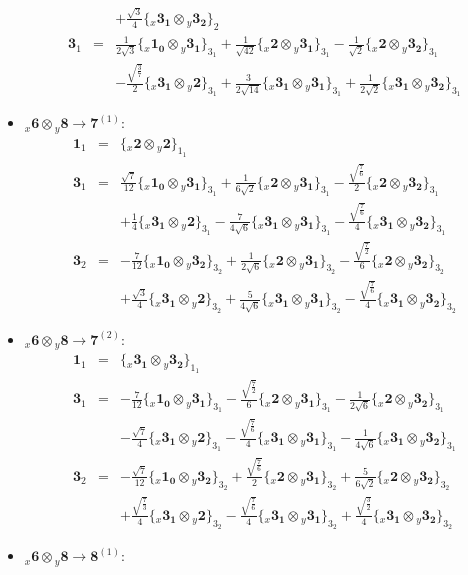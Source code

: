 \documentclass[english]{article}
\newcommand{\rep}[1]{\mathbf{#1}}
\newcommand{\repx}[2]{{}_{#2}\mathbf{#1}}
\newcommand{\subcg}[3]{\big\{ \repx{#1}{x}\otimes\repx{#2}{y}\big\}^{}_{#3}}
\begin{document}
\begin{itemize}
\begin{eqnarray*}
 & & +\frac{\sqrt{3}}{4}\subcg{3_{1}}{3_{2}}{2}
\\
\rep{3}_{1} &=& \frac{1}{2 \sqrt{3}}\subcg{1_{0}}{3_{1}}{3_{1}}+\frac{1}{\sqrt{42}}\subcg{2}{3_{1}}{3_{1}}-\frac{1}{\sqrt{2}}\subcg{2}{3_{2}}{3_{1}} \\ 
 & & -\frac{\sqrt{\frac{3}{7}}}{2}\subcg{3_{1}}{2}{3_{1}}+\frac{3}{2 \sqrt{14}}\subcg{3_{1}}{3_{1}}{3_{1}}+\frac{1}{2 \sqrt{2}}\subcg{3_{1}}{3_{2}}{3_{1}}
\end{eqnarray*}
\item $\repx{6}{x}\otimes\repx{8}{y}\to\rep{7}^{(1)}$:
\begin{eqnarray*}
\rep{1}_{1} &=& \subcg{2}{2}{1_{1}}
\\
\rep{3}_{1} &=& \frac{\sqrt{7}}{12}\subcg{1_{0}}{3_{1}}{3_{1}}+\frac{1}{6 \sqrt{2}}\subcg{2}{3_{1}}{3_{1}}-\frac{\sqrt{\frac{7}{6}}}{2}\subcg{2}{3_{2}}{3_{1}} \\ 
 & & +\frac{1}{4}\subcg{3_{1}}{2}{3_{1}}-\frac{7}{4 \sqrt{6}}\subcg{3_{1}}{3_{1}}{3_{1}}-\frac{\sqrt{\frac{7}{6}}}{4}\subcg{3_{1}}{3_{2}}{3_{1}}
\\
\rep{3}_{2} &=& -\frac{7}{12}\subcg{1_{0}}{3_{2}}{3_{2}}+\frac{1}{2 \sqrt{6}}\subcg{2}{3_{1}}{3_{2}}-\frac{\sqrt{\frac{7}{2}}}{6}\subcg{2}{3_{2}}{3_{2}} \\ 
 & & +\frac{\sqrt{3}}{4}\subcg{3_{1}}{2}{3_{2}}+\frac{5}{4 \sqrt{6}}\subcg{3_{1}}{3_{1}}{3_{2}}-\frac{\sqrt{\frac{7}{6}}}{4}\subcg{3_{1}}{3_{2}}{3_{2}}
\end{eqnarray*}
\item $\repx{6}{x}\otimes\repx{8}{y}\to\rep{7}^{(2)}$:
\begin{eqnarray*}
\rep{1}_{1} &=& \subcg{3_{1}}{3_{2}}{1_{1}}
\\
\rep{3}_{1} &=& -\frac{7}{12}\subcg{1_{0}}{3_{1}}{3_{1}}-\frac{\sqrt{\frac{7}{2}}}{6}\subcg{2}{3_{1}}{3_{1}}-\frac{1}{2 \sqrt{6}}\subcg{2}{3_{2}}{3_{1}} \\ 
 & & -\frac{\sqrt{7}}{4}\subcg{3_{1}}{2}{3_{1}}-\frac{\sqrt{\frac{7}{6}}}{4}\subcg{3_{1}}{3_{1}}{3_{1}}-\frac{1}{4 \sqrt{6}}\subcg{3_{1}}{3_{2}}{3_{1}}
\\
\rep{3}_{2} &=& -\frac{\sqrt{7}}{12}\subcg{1_{0}}{3_{2}}{3_{2}}+\frac{\sqrt{\frac{7}{6}}}{2}\subcg{2}{3_{1}}{3_{2}}+\frac{5}{6 \sqrt{2}}\subcg{2}{3_{2}}{3_{2}} \\ 
 & & +\frac{\sqrt{\frac{7}{3}}}{4}\subcg{3_{1}}{2}{3_{2}}-\frac{\sqrt{\frac{7}{6}}}{4}\subcg{3_{1}}{3_{1}}{3_{2}}+\frac{\sqrt{\frac{3}{2}}}{4}\subcg{3_{1}}{3_{2}}{3_{2}}
\end{eqnarray*}
\item $\repx{6}{x}\otimes\repx{8}{y}\to\rep{8}^{(1)}$:

\end{itemize}
\end{document}
